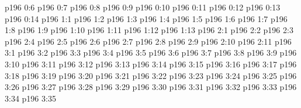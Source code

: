 \vs p196 0:6 
\vs p196 0:7 
\vs p196 0:8 
\vs p196 0:9 
\vs p196 0:10 
\vs p196 0:11 
\vs p196 0:12 
\vs p196 0:13 
\vs p196 0:14 
\vs p196 1:1 
\vs p196 1:2 
\vs p196 1:3 \pc 
\vs p196 1:4 
\vs p196 1:5 
\vs p196 1:6 
\vs p196 1:7 
\vs p196 1:8 
\vs p196 1:9 
\vs p196 1:10 
\vs p196 1:11 
\vs p196 1:12 
\vs p196 1:13 
\vs p196 2:1 
\vs p196 2:2 
\vs p196 2:3 
\vs p196 2:4 
\vs p196 2:5 
\vs p196 2:6 \pc 
\vs p196 2:7 
\vs p196 2:8 
\vs p196 2:9 
\vs p196 2:10 
\vs p196 2:11 
\vs p196 3:1 
\vs p196 3:2 
\vs p196 3:3 
\vs p196 3:4 
\vs p196 3:5 
\vs p196 3:6 
\vs p196 3:7 
\vs p196 3:8 
\vs p196 3:9 
\vs p196 3:10 \pc 
\vs p196 3:11 
\vs p196 3:12 
\vs p196 3:13 
\vs p196 3:14 
\vs p196 3:15 \pc 
\vs p196 3:16 
\vs p196 3:17 
\vs p196 3:18 
\vs p196 3:19 
\vs p196 3:20 
\vs p196 3:21 
\vs p196 3:22 
\vs p196 3:23 
\vs p196 3:24 
\vs p196 3:25 
\vs p196 3:26 
\vs p196 3:27 
\vs p196 3:28 
\vs p196 3:29 \pc 
\vs p196 3:30 \pc 
\vs p196 3:31 \pc 
\vs p196 3:32 
\vs p196 3:33 
\vs p196 3:34 
\vs p196 3:35 
\quizlink
